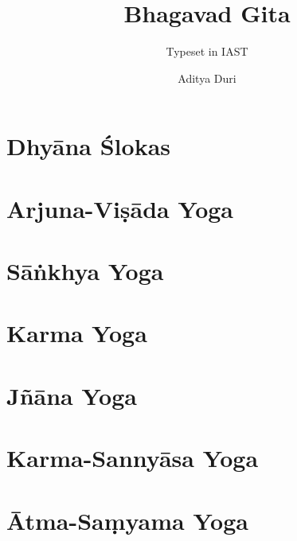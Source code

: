 \documentclass[headings=small]{scrbook}
\title{Bhagavad Gita}
\subtitle{Typeset in IAST}
\author{Aditya Duri}
\date{}
\begin{document}
\maketitle
\frontmatter

\tableofcontents
\newpage

\chapter{Dhyāna Ślokas}


\mainmatter
\chapter{Arjuna-Viṣāda Yoga}


\chapter{Sāṅkhya Yoga}


\chapter{Karma Yoga}


\chapter{Jñāna Yoga}


\chapter{Karma-Sannyāsa Yoga}


\chapter{Ātma-Saṃyama Yoga}

\end{document}
